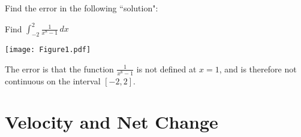 \documentclass[nooutcomes]{ximera}
\renewcommand{\d}{\,d}
\renewenvironment{freeResponse}{
\ifhandout\setbox0\vbox\bgroup\else
\begin{trivlist}\item[\hskip \labelsep\bfseries Solution:\hspace{2ex}]
\fi}
{\ifhandout\egroup\else
\end{trivlist}
\fi}
\begin{document}
		
		
		
		
		
			
			
	



\newpage



\begin{problem}
Find the error in the following ``solution":

Find $\int_{-2}^2 \frac{1}{x^8 - 1} \d x$

	\begin{image}
	\texttt{[image: Figure1.pdf]}
	\end{image}

	\begin{freeResponse}
	The error is that the function $\frac{1}{x^8-1}$ is not defined at $x=1$, and is therefore not continuous on the interval $[-2,2]$.
	\end{freeResponse}
\end{problem}

\section{Velocity and Net Change}
\end{document}
